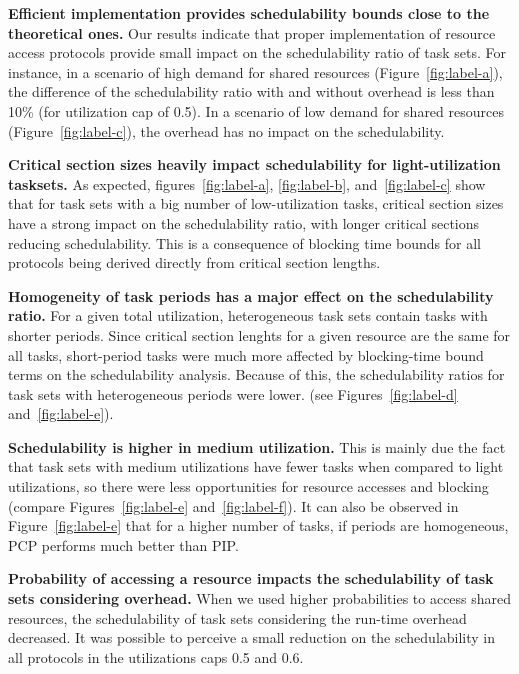 \textbf{Efficient implementation provides schedulability bounds close to the 
theoretical ones.} Our results indicate that proper implementation of resource 
access protocols provide small impact on the schedulability ratio of task sets. 
For instance, in a scenario of high demand for shared resources 
(Figure~\ref{fig:label-a}), the difference of the schedulability ratio with and 
without overhead is less than 10\% (for utilization cap of 0.5). In a scenario 
of low demand for shared resources (Figure~\ref{fig:label-c}), the overhead has 
no impact on the schedulability.

\textbf{Critical section sizes heavily impact schedulability for light-utilization tasksets.} As expected, figures~\ref{fig:label-a}, \ref{fig:label-b}, and~\ref{fig:label-c} show that for task sets with a big number of low-utilization tasks, critical section sizes have a strong impact on the schedulability ratio, with longer critical sections reducing schedulability. This is a consequence of blocking time bounds for all protocols being derived directly from critical section lengths.

\textbf{Homogeneity of task periods has a major effect on the schedulability ratio.}
For a given total utilization, heterogeneous task sets contain tasks with shorter periods. Since critical section lenghts for a given resource are the same for all tasks, short-period tasks were much more affected by blocking-time bound terms on the schedulability analysis. Because of this, the schedulability ratios for task sets with heterogeneous periods were lower.
(see Figures~\ref{fig:label-d} and~\ref{fig:label-e}).

\textbf{Schedulability is higher in medium utilization.} This is mainly 
due the fact that task sets with medium utilizations have fewer tasks when 
compared to light utilizations, so there were less opportunities for resource accesses and blocking (compare Figures~\ref{fig:label-e} and~\ref{fig:label-f}). It can also be observed in Figure~\ref{fig:label-e} that for a higher number of tasks, if periods are homogeneous, PCP performs much better than PIP.

\textbf{Probability of accessing a resource impacts the schedulability of task 
sets considering overhead.} When we used higher probabilities to access shared 
resources, the schedulability of task sets considering the run-time overhead 
decreased. It was possible to perceive a small reduction on the 
schedulability in all protocols in the utilizations caps 0.5 and 0.6.